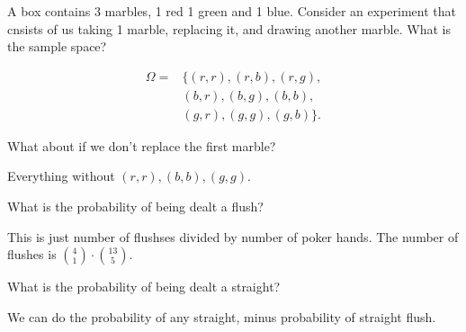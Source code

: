 \begin{eg}
	A box contains 3 marbles, 1 red 1 green and 1 blue. Consider an experiment that cnsists of us taking 1 marble, replacing it, and drawing another marble. What is the sample space?
\end{eg}
\begin{explanation}
	\begin{align*}
		\Omega = & \{(r,r),(r,b),(r,g), \\ & (b,r),(b,g),(b,b), \\ & (g,r),(g,g),(g,b)\}
	.\end{align*}
\end{explanation}

\begin{eg}
	What about if we don't replace the first marble?
\end{eg}
\begin{explanation}
	Everything without \( (r,r),(b,b),(g,g) \).
\end{explanation}

\begin{eg}
	What is the probability of being dealt a flush?
\end{eg}
\begin{explanation}
	This is just number of flushses divided by number of poker hands. The number of flushes is \( \binom{4}{1} \cdot \binom{13}{5} \).
\end{explanation}

\begin{eg}
	What is the probability of being dealt a straight?
\end{eg}
\begin{explanation}
	We can do the probability of any straight, minus probability of straight flush.
\end{explanation}
